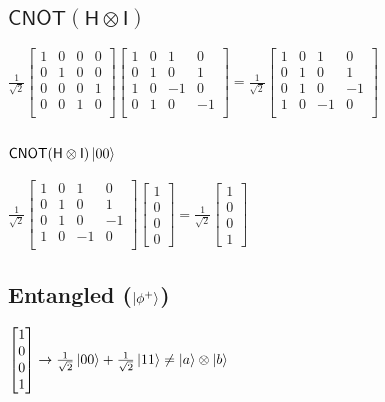 \documentclass{iansnotes}
\begin{document}
\subsection{$\mathsf{CNOT}(\mathsf{H} \otimes \mathsf{I})$}
$\frac{1}{\sqrt{2}}\begin{bmatrix}
  1 & 0 & 0 & 0 \\
  0 & 1 & 0 & 0 \\
  0 & 0 & 0 & 1 \\
  0 & 0 & 1 & 0 \\
\end{bmatrix}\begin{bmatrix}
  1 & 0 &  1 &  0 \\
  0 & 1 &  0 &  1 \\
  1 & 0 & -1 &  0 \\
  0 & 1 &  0 & -1 \\
\end{bmatrix}=\frac{1}{\sqrt{2}}\begin{bmatrix}
  1 & 0 &  1 &  0 \\
  0 & 1 &  0 &  1 \\
  0 & 1 &  0 & -1 \\
  1 & 0 & -1 &  0 \\
\end{bmatrix}$

\subsection{$\mathsf{CNOT}(\mathsf{H} \otimes \mathsf{I}) \ket{00}$}
$\frac{1}{\sqrt{2}}\begin{bmatrix}
  1 & 0 &  1 &  0 \\
  0 & 1 &  0 &  1 \\
  0 & 1 &  0 & -1 \\
  1 & 0 & -1 &  0 \\
\end{bmatrix}
\begin{bmatrix} 1 \\ 0 \\ 0 \\ 0 \end{bmatrix} = \frac{1}{\sqrt{2}}\begin{bmatrix} 1 \\ 0 \\ 0 \\ 1 \end{bmatrix} $

\subsection{Entangled ($\ket{\phi^+}$)}
$\begin{bmatrix} 1 \\ 0 \\ 0 \\ 1 \end{bmatrix} \rightarrow \frac{1}{\sqrt{2}} \ket{00} + \frac{1}{\sqrt{2}} \ket{11} \neq \ket{a} \otimes \ket{b}$
\end{document}
